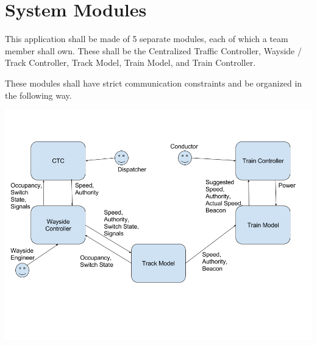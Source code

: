 \documentclass{scrreprt}
\begin{document}




\chapter{System Modules}
This application shall be made of 5 separate modules, each of which a team member shall own.
These shall be the Centralized Traffic Controller, Wayside / Track Controller, Track Model, Train Model, and Train Controller.

These modules shall have strict communication constraints and be organized in the following way.

\includegraphics[width=\textwidth]{srs-module-overview}
\end{document}
